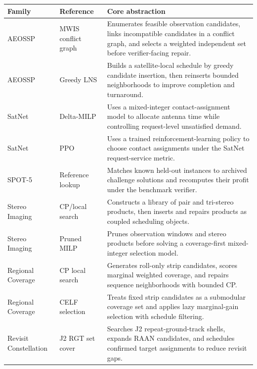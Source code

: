 \documentclass[]{mosi}
\begin{document}
\begin{table}[!t]
\centering
\scriptsize
\setlength{\tabcolsep}{3pt}
\renewcommand{\arraystretch}{1.12}
\begin{tabular}{>{\raggedright\arraybackslash}p{}>{\raggedright\arraybackslash}p{}>{\raggedright\arraybackslash}p{}}
\hline
\textbf{Family} & \textbf{Reference} & \textbf{Core abstraction} \\
\hline
AEOSSP & MWIS conflict graph \citep{eddy2021maximum} & Enumerates feasible observation candidates, links incompatible candidates in a conflict graph, and selects a weighted independent set before verifier-facing repair. \\
AEOSSP & Greedy LNS \citep{antuori2025solving} & Builds a satellite-local schedule by greedy candidate insertion, then reinserts bounded neighborhoods to improve completion and turnaround. \\
SatNet & Delta-MILP \citep{claudet2021delta} & Uses a mixed-integer contact-assignment model to allocate antenna time while controlling request-level unsatisfied demand. \\
SatNet & PPO \citep{goh2022satnet} & Uses a trained reinforcement-learning policy to choose contact assignments under the SatNet request-service metric. \\
SPOT-5 & Reference lookup \citep{lemaitrea2002selecting} & Matches known held-out instances to archived challenge solutions and recomputes their profit under the benchmark verifier. \\
Stereo Imaging & CP/local search \citep{lemaitrea2002selecting} & Constructs a library of pair and tri-stereo products, then inserts and repairs products as coupled scheduling objects. \\
Stereo Imaging & Pruned MILP \citep{kim2020task} & Prunes observation windows and stereo products before solving a coverage-first mixed-integer selection model. \\
Regional Coverage & CP local search \citep{antuori2025solving} & Generates roll-only strip candidates, scores marginal weighted coverage, and repairs sequence neighborhoods with bounded CP. \\
Regional Coverage & CELF selection \citep{leskovec2007cost,nemhauser1978analysis,khuller1999budgeted} & Treats fixed strip candidates as a submodular coverage set and applies lazy marginal-gain selection with schedule filtering. \\
Revisit Constellation & J2 RGT set cover \citep{lee2024satellite} & Searches J2 repeat-ground-track shells, expands RAAN candidates, and schedules confirmed target assignments to reduce revisit gaps. \\

\end{tabular}
\end{table}
\end{document}
